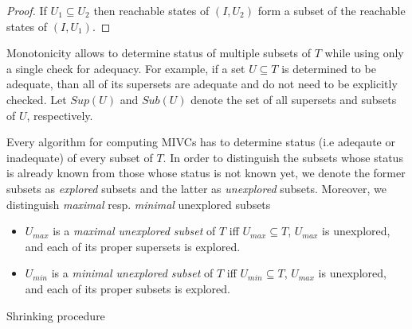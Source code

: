 \begin{proof}
If $U_1 \subseteq U_2$ then reachable states of $(I, U_2)$ form  a subset of the reachable states
of $(I, U_1)$.
\end{proof}
%


Monotonicity allows  to determine status  of multiple subsets of $T$ while using only a single check for adequacy. For example, if a set $U \subseteq T$ is determined to be adequate, than all of its supersets are   adequate and do not need to be explicitly checked. Let     $\mathit{Sup}(U)$ and $\mathit{Sub}(U)$ denote the set of all supersets and subsets of $U$, respectively.

Every algorithm for computing MIVCs has to determine status (i.e adeqaute or inadequate) of every subset of $T$.  In order to distinguish the subsets whose status is already known from those whose status is not known yet, we denote the former subsets as \emph{explored} subsets and the latter as \emph{unexplored} subsets. Moreover, we distinguish \emph{maximal} resp. \emph{minimal} unexplored subsets
\begin{itemize}
	\item $U_{max}$ is a \emph{maximal unexplored subset} of $T$ iff $U_{max} \subseteq T$, $U_{max}$ is unexplored, and each of its proper supersets is explored.
	\item $U_{min}$ is a \emph{minimal unexplored subset} of $T$ iff $U_{min} \subseteq T$, $U_{max}$ is unexplored, and each of its proper subsets is explored.
\end{itemize}



\begin{algorithm}[!t]\label{shrin-procedure}

\caption{Shrinking procedure }
\end{algorithm}


